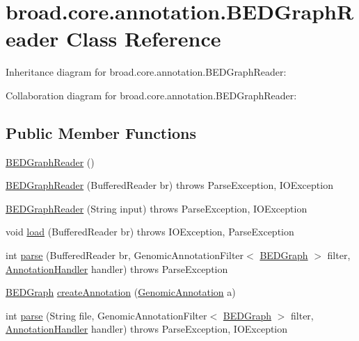 \hypertarget{classbroad_1_1core_1_1annotation_1_1_b_e_d_graph_reader}{\section{broad.\+core.\+annotation.\+B\+E\+D\+Graph\+Reader Class Reference}
\label{classbroad_1_1core_1_1annotation_1_1_b_e_d_graph_reader}
}


Inheritance diagram for broad.\+core.\+annotation.\+B\+E\+D\+Graph\+Reader\+:


Collaboration diagram for broad.\+core.\+annotation.\+B\+E\+D\+Graph\+Reader\+:
\subsection*{Public Member Functions}
\begin{DoxyCompactItemize}
\item 
\hyperlink{classbroad_1_1core_1_1annotation_1_1_b_e_d_graph_reader_a1855df971b864e95f9996a2da58dedb0}{B\+E\+D\+Graph\+Reader} ()
\item 
\hyperlink{classbroad_1_1core_1_1annotation_1_1_b_e_d_graph_reader_afd2c640a28cc9158a11ee046a704d1e2}{B\+E\+D\+Graph\+Reader} (Buffered\+Reader br)  throws Parse\+Exception, I\+O\+Exception 
\item 
\hyperlink{classbroad_1_1core_1_1annotation_1_1_b_e_d_graph_reader_add9e0917462592403ecdb86f32031df6}{B\+E\+D\+Graph\+Reader} (String input)  throws Parse\+Exception, I\+O\+Exception 
\item 
void \hyperlink{classbroad_1_1core_1_1annotation_1_1_b_e_d_graph_reader_a952fbe83182a123fc849412ad9efe4c0}{load} (Buffered\+Reader br)  throws I\+O\+Exception, Parse\+Exception 
\item 
int \hyperlink{classbroad_1_1core_1_1annotation_1_1_b_e_d_graph_reader_a7e68728f269fe222b78989d125fa53cc}{parse} (Buffered\+Reader br, Genomic\+Annotation\+Filter$<$ \hyperlink{classbroad_1_1core_1_1annotation_1_1_b_e_d_graph}{B\+E\+D\+Graph} $>$ filter, \hyperlink{interfacebroad_1_1core_1_1annotation_1_1_annotation_handler}{Annotation\+Handler} handler)  throws Parse\+Exception 
\item 
\hyperlink{classbroad_1_1core_1_1annotation_1_1_b_e_d_graph}{B\+E\+D\+Graph} \hyperlink{classbroad_1_1core_1_1annotation_1_1_b_e_d_graph_reader_a38845de37182e1215200b0e3772c540f}{create\+Annotation} (\hyperlink{interfacebroad_1_1core_1_1annotation_1_1_genomic_annotation}{Genomic\+Annotation} a)
\item 
int \hyperlink{classbroad_1_1core_1_1annotation_1_1_b_e_d_graph_reader_a5d8eaf8f0bdd436ac6f5230e1842ecf8}{parse} (String file, Genomic\+Annotation\+Filter$<$ \hyperlink{classbroad_1_1core_1_1annotation_1_1_b_e_d_graph}{B\+E\+D\+Graph} $>$ filter, \hyperlink{interfacebroad_1_1core_1_1annotation_1_1_annotation_handler}{Annotation\+Handler} handler)  throws Parse\+Exception, I\+O\+Exception 
\end{DoxyCompactItemize}


